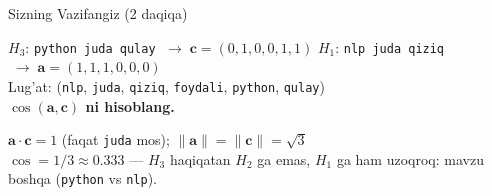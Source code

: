 \documentclass[aspectratio=169,11pt]{beamer}
\begin{document}
\begin{frame}{Sizning Vazifangiz \textnormal{\small (2 daqiqa)}}
  \begin{tcolorbox}[warnbox,title=Savol]
    \small $H_3$: \texttt{python juda qulay}
    $\;\to\;\mathbf{c}=(0,1,0,0,1,1)$ \quad
    $H_1$: \texttt{nlp juda qiziq}
    $\;\to\;\mathbf{a}=(1,1,1,0,0,0)$\\[3pt]
    {\scriptsize\color{halfgray}Lug'at: (\texttt{nlp}, \texttt{juda},
    \texttt{qiziq}, \texttt{foydali}, \texttt{python}, \texttt{qulay})}\\[5pt]
    \textbf{\large $\cos(\mathbf{a},\mathbf{c})$ ni hisoblang.}
  \end{tcolorbox}
  \pause
  \vspace{0.3em}
  \begin{tcolorbox}[okbox,title=Javob]
    \small
    $\mathbf{a}\cdot\mathbf{c} = 1$ (faqat \texttt{juda} mos);\quad
    $\lVert\mathbf{a}\rVert = \lVert\mathbf{c}\rVert = \sqrt{3}$\\[3pt]
    $\cos = 1/3 \approx \mathbf{0.333}$ ---
    $H_3$ haqiqatan $H_2$ ga emas, $H_1$ ga ham uzoqroq:
    mavzu boshqa (\texttt{python} vs \texttt{nlp}).
  \end{tcolorbox}
\end{frame}
\end{document}
